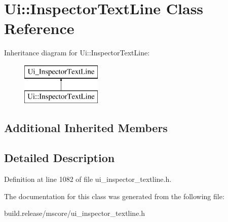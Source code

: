 \hypertarget{class_ui_1_1_inspector_text_line}{}\section{Ui\+:\+:Inspector\+Text\+Line Class Reference}
\label{class_ui_1_1_inspector_text_line}
Inheritance diagram for Ui\+:\+:Inspector\+Text\+Line\+:\begin{figure}[H]
\begin{center}
\leavevmode
\includegraphics[height=2.000000cm]{class_ui_1_1_inspector_text_line}
\end{center}
\end{figure}
\subsection*{Additional Inherited Members}


\subsection{Detailed Description}


Definition at line 1082 of file ui\+\_\+inspector\+\_\+textline.\+h.



The documentation for this class was generated from the following file\+:\begin{DoxyCompactItemize}
\item 
build.\+release/mscore/ui\+\_\+inspector\+\_\+textline.\+h\end{DoxyCompactItemize}
